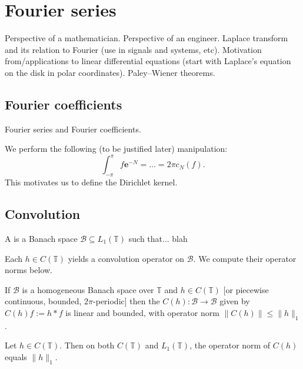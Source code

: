 \section{Fourier series}



Perspective of a mathematician. Perspective of an engineer. Laplace transform and its relation to Fourier (use in signals and systems, etc). Motivation from/applications to linear differential equations (start with Laplace's equation on the disk in polar coordinates). Paley--Wiener theorems.

\subsection{Fourier coefficients}

Fourier series and Fourier coefficients.

We perform the following (to be justified later) manipulation:
\[ \int_{-\pi}^{\pi} f \mathbf{e}^{-N} = \ldots = 2\pi c_N(f). \]
This motivates us to define the Dirichlet kernel.

\subsection{Convolution}

\begin{definition}
A  is a Banach space $\mathcal{B} \subseteq L_1(\mathbb{T})$ such that... blah
\end{definition}

Each $h \in C(\mathbb{T})$ yields a convolution operator on $\mathcal{B}$. We compute their operator norms below.

\begin{proposition}
If $\mathcal B$ is a homogeneous Banach space over $\mathbb{T}$ and $h \in C(\mathbb{T})$ [or piecewise continuous, bounded, $2\pi$-periodic] then the  $C(h) : \mathcal{B} \to \mathcal{B}$ given by $C(h)f := h * f$ is linear and bounded, with operator norm $\| C(h) \| \leq \| h \|_1$.
\end{proposition}

\begin{theorem}
Let $h \in C(\mathbb{T})$. Then on both $C(\mathbb{T})$ and $L_1(\mathbb{T})$, the operator norm of $C(h)$ equals $\| h \|_1$.
\end{theorem}

